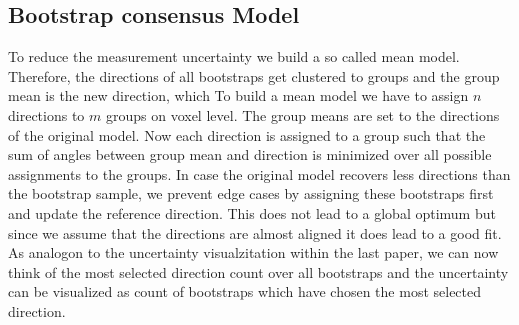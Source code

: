\subsection{Bootstrap consensus Model}
To reduce the measurement uncertainty we build a so called mean model.
Therefore, the directions of all bootstraps get clustered to groups and the
group mean is the new direction, which 
To build a mean model we have to assign $n$ directions to $m$ groups on voxel
level. The group means are set to the directions of the original model. Now each
direction is assigned to a group such that the sum of angles between group mean
and direction is minimized over all possible assignments to the groups. In case
the original model recovers less directions than the bootstrap sample, we
prevent edge cases by assigning these bootstraps first and update the reference
direction. This does not lead to a global optimum but since we assume that the
directions are almost aligned it does lead to a good fit. 
As analogon to the uncertainty visualzitation within the last paper, we can now
think of the most selected direction count over all bootstraps and the
uncertainty can be visualized as count of bootstraps which have chosen the most
selected direction. 


